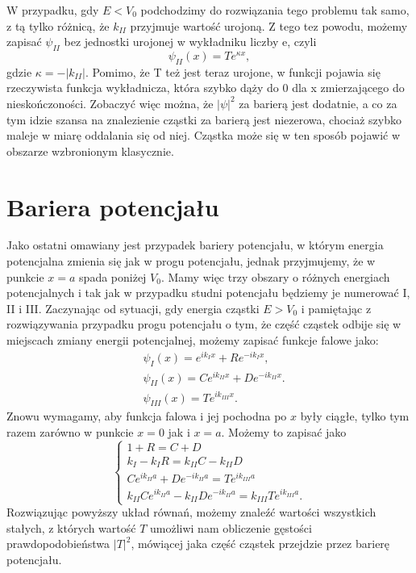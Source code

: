 \documentclass{SGGW-thesis}
\begin{document}
W przypadku, gdy $E < V_0$ podchodzimy do rozwiązania tego problemu tak samo, z tą tylko różnicą, że $k_{II}$ przyjmuje wartość urojoną. Z tego tez powodu, możemy zapisać $\psi_{II}$ bez jednostki urojonej w wykładniku liczby e, czyli
	\begin{equation}
	\psi_{II}(x) = Te^{\kappa x},
	\end{equation}
gdzie $\kappa=-|k_{II}|$. Pomimo, że T też jest teraz urojone, w funkcji pojawia się rzeczywista funkcja wykładnicza, która szybko dąży do 0 dla x zmierzającego do nieskończoności. Zobaczyć więc można, że $|\psi|^2$ za barierą jest dodatnie, a co za tym idzie szansa na znalezienie cząstki za barierą jest niezerowa, chociaż szybko maleje w miarę oddalania się od niej. Cząstka może się w ten sposób pojawić w obszarze wzbronionym klasycznie.

	\section{Bariera potencjału}
	Jako ostatni omawiany jest przypadek bariery potencjału, w którym energia potencjalna zmienia się jak w progu potencjału, jednak przyjmujemy, że w punkcie $x=a$ spada poniżej $V_0$. Mamy więc trzy obszary o różnych energiach potencjalnych i tak jak w przypadku studni potencjału będziemy je numerować I, II i III. Zaczynając od sytuacji, gdy energia cząstki $E>V_0$ i pamiętając z rozwiązywania przypadku progu potencjału o tym, że część cząstek odbije się w miejscach zmiany energii potencjalnej, możemy zapisać funkcje falowe jako:
	\begin{equation}
	\begin{split}
		&\psi_I(x) = e^{ik_Ix} + Re^{-ik_Ix}, \\
		&\psi_{II}(x) = Ce^{ik_{II}x} + De^{-ik_{II}x}. \\
		&\psi_{III}(x) = Te^{ik_{III}x}.
	\end{split}
	\end{equation}
Znowu wymagamy, aby funkcja falowa i jej pochodna po $x$ były ciągłe, tylko tym razem zarówno w punkcie $x=0$ jak i $x=a$. Możemy to zapisać jako
	\begin{equation}\label{eqn:barrier-system}
	\begin{cases}
		1 + R = C + D \\
		k_I - k_IR = k_{II}C - k_{II}D \\
		Ce^{ik_{II}a} + De^{-ik_{II}a} = Te^{ik_{III}a} \\
		k_{II}Ce^{ik_{II}a} - k_{II}De^{-ik_{II}a} = k_{III}Te^{ik_{III}a}.
	\end{cases}
	\end{equation}
Rozwiązując powyższy układ równań, możemy znaleźć wartości wszystkich stałych, z których wartość $T$ umożliwi nam obliczenie gęstości prawdopodobieństwa $|T|^2$, mówiącej jaka część cząstek przejdzie przez barierę potencjału. 
\end{document}
